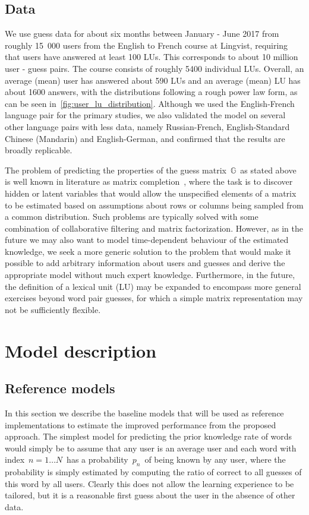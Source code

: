 \subsection{Data}
We use guess data for about six months between January - June 2017 from roughly 15~000 users from the English to French course at Lingvist, requiring that users have answered at least 100 LUs. This corresponds to about 10 million user - guess pairs. The course consists of roughly 5400 individual LUs. Overall, an average (mean) user has answered about 590 LUs and an average (mean) LU has about 1600 answers, with the distributions following a rough power law form, as can be seen in~\cref{fig:user_lu_distribution}. Although we used the English-French language pair for the primary studies, we also validated the model on several other language pairs with less data, namely Russian-French, English-Standard Chinese (Mandarin) and English-German, and confirmed that the results are broadly replicable.

The problem of predicting the properties of the guess matrix~$\mathbb{G}$~as stated above is well known in literature as matrix completion~\cite{candes2009exact}, where the task is to discover hidden or latent variables that would allow the unspecified elements of a matrix to be estimated based on assumptions about rows or columns being sampled from a common distribution. Such problems are typically solved with some combination of collaborative filtering and matrix factorization. However, as in the future we may also want to model time-dependent behaviour of the estimated knowledge, we seek a more generic solution to the problem that would make it possible to add arbitrary information about users and guesses and derive the appropriate model without much expert knowledge. Furthermore, in the future, the definition of a lexical unit (LU) may be expanded to encompass more general exercises beyond word pair guesses, for which a simple matrix representation may not be sufficiently flexible. 

\section{Model description}
\label{sec:lingvist_model}

\subsection{Reference models}

In this section we describe the baseline models that will be used as reference implementations to estimate the improved performance from the proposed approach. The simplest model for predicting the prior knowledge rate of words would simply be to assume that any user is an average user and each word with index~$n=1 \dots N$~has a probability~$p_n$~of being known by any user, where the probability is simply estimated by computing the ratio of correct to all guesses of this word by all users. Clearly this does not allow the learning experience to be tailored, but it is a reasonable first guess about the user in the absence of other data.

